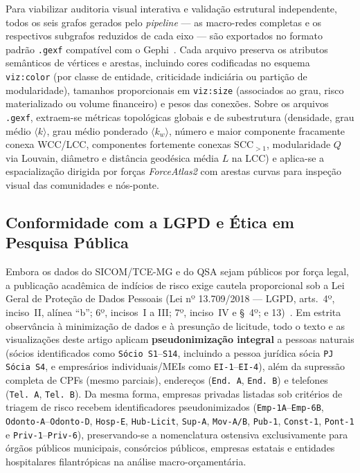 Para viabilizar auditoria visual interativa e validação estrutural independente, todos os seis grafos gerados pelo \textit{pipeline} — as macro-redes completas e os respectivos subgrafos reduzidos de cada eixo — são exportados no formato padrão \texttt{.gexf} compatível com o Gephi~\cite{projeto_github}. Cada arquivo preserva os atributos semânticos de vértices e arestas, incluindo cores codificadas no esquema \texttt{viz:color} (por classe de entidade, criticidade indiciária ou partição de modularidade), tamanhos proporcionais em \texttt{viz:size} (associados ao grau, risco materializado ou volume financeiro) e pesos das conexões. Sobre os arquivos \texttt{.gexf}, extraem-se métricas topológicas globais e de subestrutura (densidade, grau médio $\langle k \rangle$, grau médio ponderado $\langle k_w \rangle$, número e maior componente fracamente conexa WCC/LCC, componentes fortemente conexas $\text{SCC}_{>1}$, modularidade $Q$ via Louvain, diâmetro e distância geodésica média $L$ na LCC) e aplica-se a espacialização dirigida por forças \textit{ForceAtlas2} com arestas curvas para inspeção visual das comunidades e nós-ponte.

\subsection{Conformidade com a LGPD e Ética em Pesquisa Pública}

Embora os dados do SICOM/TCE-MG e do QSA sejam públicos por força legal, a publicação acadêmica de indícios de risco exige cautela proporcional sob a Lei Geral de Proteção de Dados Pessoais (Lei nº 13.709/2018 — LGPD, arts.~4º, inciso~II, alínea ``b''; 6º, incisos~I a III; 7º, inciso~IV e §~4º; e 13)~\cite{brasil2018lgpd}. Em estrita observância à minimização de dados e à presunção de licitude, todo o texto e as visualizações deste artigo aplicam \textbf{pseudonimização integral} a pessoas naturais (sócios identificados como \texttt{Sócio S1}--\texttt{S14}, incluindo a pessoa jurídica sócia \texttt{PJ Sócia S4}, e empresários individuais/MEIs como \texttt{EI-1}--\texttt{EI-4}), além da supressão completa de CPFs (mesmo parciais), endereços (\texttt{End. A}, \texttt{End. B}) e telefones (\texttt{Tel. A}, \texttt{Tel. B}). Da mesma forma, empresas privadas listadas sob critérios de triagem de risco recebem identificadores pseudonimizados (\texttt{Emp-1A}--\texttt{Emp-6B}, \texttt{Odonto-A}--\texttt{Odonto-D}, \texttt{Hosp-E}, \texttt{Hub-Licit}, \texttt{Sup-A}, \texttt{Mov-A/B}, \texttt{Pub-1}, \texttt{Const-1}, \texttt{Pont-1} e \texttt{Priv-1}--\texttt{Priv-6}), preservando-se a nomenclatura ostensiva exclusivamente para órgãos públicos municipais, consórcios públicos, empresas estatais e entidades hospitalares filantrópicas na análise macro-orçamentária.
